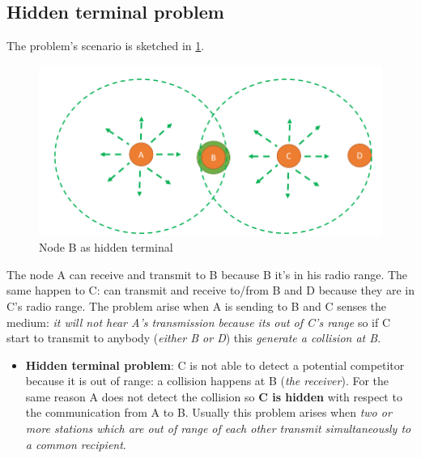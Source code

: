 \documentclass[10pt,a4paper]{report}
\theoremstyle{definition}
\begin{document}
\subsection{Hidden terminal problem}\label{sec:hidden-terminal-problem}
The problem's scenario is sketched in \ref{hidden-terminal}.
\begin{figure}[h!]
	\centering\includegraphics[scale=0.50]{images/Pasted image 20230225100029.png}
	\caption{Node B as hidden terminal}
	\label{hidden-terminal}
\end{figure}
The node A can receive and transmit to B because B it's in his radio range. The same happen to C: can transmit and receive to/from B and D because they are in C's radio range.
The problem arise when A is sending to B and C senses the medium: \textit{it will not hear A's transmission because its out of C's range} so if C start to transmit to anybody (\textit{either B or D}) this \textit{generate a collision at B}.
\begin{itemize}
	\item 
	\textbf{Hidden terminal problem}: C is not able to detect a potential competitor because it is out of range: a collision happens at B (\textit{the receiver}). For the same reason A does not detect the collision so \textbf{C is hidden} with respect to the communication from A to B.
	Usually this problem arises when \textit{two or more stations which are out of range of each other transmit simultaneously to a common recipient}.
\end{itemize}
\end{document}
